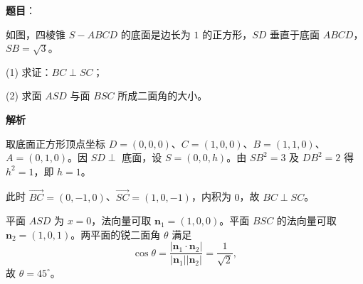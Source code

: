 \begin{answer}

\textbf{题目}：

如图，四棱锥 $S-ABCD$ 的底面是边长为 $1$ 的正方形，$SD$ 垂直于底面 $ABCD$，$SB=\sqrt3$。

(1) 求证：$BC\perp SC$；

(2) 求面 $ASD$ 与面 $BSC$ 所成二面角的大小。
\nopagebreak[4]
\begin{center}\end{center}
\nopagebreak[4]
\textbf{解析}


取底面正方形顶点坐标 $D=(0,0,0)$、$C=(1,0,0)$、$B=(1,1,0)$、$A=(0,1,0)$。因 $SD\perp$ 底面，设 $S=(0,0,h)$。由 $SB^2=3$ 及 $DB^2=2$ 得 $h^2=1$，即 $h=1$。

此时 $\overrightarrow{BC}=(0,-1,0)$、$\overrightarrow{SC}=(1,0,-1)$，内积为 $0$，故 $BC\perp SC$。


平面 $ASD$ 为 $x=0$，法向量可取 $\boldsymbol n_1=(1,0,0)$。平面 $BSC$ 的法向量可取 $\boldsymbol n_2=(1,0,1)$。两平面的锐二面角 $\theta$ 满足
\nopagebreak[4]
\[
\cos\theta=\frac{|\boldsymbol n_1\cdot\boldsymbol n_2|}{|\boldsymbol n_1||\boldsymbol n_2|}=\frac1{\sqrt2},
\]
故 $\theta=45^\circ$。



\end{answer}
